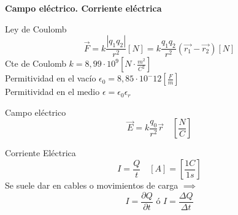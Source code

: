 \documentclass{article}
\begin{document}
\begin{center}
    \LARGE \textbf{Campo eléctrico. Corriente eléctrica}
\end{center}

\begin{multicols}{3} %

\begin{teorema}{Ley de Coulomb}
    $$\vec{F} = k\frac{|q_1q_2|}{r^2}[N] = k\frac{q_1q_2}{r^2}(\vec{r_1} - \vec{r_2}) [N]$$
    Cte de Coulomb $k = 8,99 \cdot 10^9 [N\cdot \frac{m^2}{C^2}]$\\
    Permitividad en el vacío $\epsilon_0 = 8,85 \cdot 10^-12 [\frac{F}{m}]$\\
    Permitividad en el medio $\epsilon = \epsilon_0\epsilon_r$
\end{teorema}

\begin{teorema}{Campo eléctrico}
    $$\vec{E} = k\frac{q_0}{r^2}\vec{r}\quad [\frac{N}{C}]$$
\end{teorema}

\begin{teorema}{Corriente Eléctrica}
    $$ I = \frac{Q}{t} \quad [A] = [\frac{1 C}{1 s}]$$
    Se suele dar en cables o movimientos de carga $\implies$\\
    $$ I = \frac{\partial{Q}}{\partial{t}} \text{ ó } I = \frac{\Delta{Q}}{\Delta{t}}$$
\end{teorema}


\columnbreak


\end{multicols} %
\end{document}
